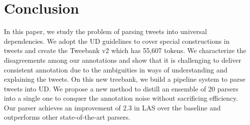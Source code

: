 \documentclass[11pt,a4paper]{article}
\begin{document}

\section{Conclusion}
In this paper, we study the problem of parsing tweets into universal dependencies.
We adopt the UD guidelines to cover 
special constructions in tweets and create
the {\sc Tweebank v2} which has 55,607 tokens. We characterize the disagreements
among our annotations and show that it is challenging to deliver
consistent annotation due to the ambiguities in ways of
understanding and explaining the tweets. On this new treebank,
we build a pipeline system to parse tweets into UD. We 
propose a new method to distill an ensemble of 20 parsers into a single one
to conquer the annotation noise without sacrificing efficiency.
Our parser achieves an improvement of 2.3 in LAS over the baseline
and outperforms other state-of-the-art parsers.



\end{document}
